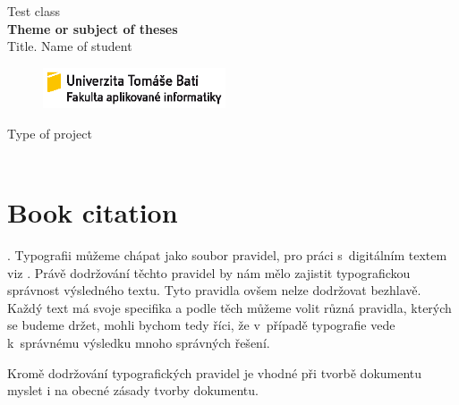 \documentclass[11pt, a4paper]{article}
\newcommand\workType{Type of project}
\newcommand\class{Test class}
\newcommand\subject{\textbf{Theme or subject of theses}}
\newcommand\name{Title. Name of student}
\begin{document}
\begin{titlepage}
    \begin{center}
        \LARGE
        \class{} \\ 
        \Huge
        \subject{} \\
        \LARGE
        \name{} \\

    \end{center}

    \begin{figure}
        \vspace{-33pt}
        \begin{center}
            \includegraphics[width=0.48\textwidth]{fai.eps}
        \end{center}
    \end{figure}

    {{\noindent \Large\workType{}} \\
    \\
    \Large\the\year{}}

\end{titlepage}

\tableofcontents

\newpage
\section{Book citation}

.
Typografii můžeme chápat jako soubor pravidel, pro práci s~digitálním textem viz \cite{prakt:2000}. Právě dodržování těchto pravidel by nám mělo zajistit typografickou správnost výsledného textu.
Tyto pravidla ovšem nelze dodržovat bezhlavě. Každý text má svoje specifika a podle těch můžeme volit různá pravidla, kterých se budeme držet, mohli bychom tedy říci, že v~případě typografie vede k~správnému výsledku mnoho správných řešení.

Kromě dodržování typografických pravidel je vhodné při tvorbě dokumentu myslet i na obecné zásady tvorby dokumentu.
\end{document}
